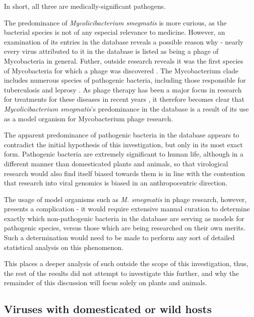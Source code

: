\documentclass[12pt]{article}
\begin{document}
    In short, all three are medically-significant pathogens.

    The predominance of \emph{Mycolicibacterium smegmatis} is more curious, as the
    bacterial species is not of any especial relevance to medicine. However, an examination of 
    its entries in the database reveals a possible reason why - nearly every virus
    attributed to it in the database is listed as being a phage of Mycobacteria in
    general. Futher, outside research reveals it was the first species of
    Mycobacteria for which a phage was discovered \cite{first_myco}.
    The Mycobacterium clade includes numerous species of pathogenic
    bacteria, including those responsible for tuberculosis and leprosy \cite{myco}. As 
    phage therapy has been a major focus in research for treatments for these
    diseases in recent years \cite{myco_phage}, it therefore becomes clear that
    \emph{Mycolicibacterium smegmatis}'s predominance in the database is a result
    of its use as a model organism for Mycobacterium phage research.

    The apparent predominance of pathogenic bacteria in the database appears
    to contradict the initial hypothesis of this investigation, but only in its
    most exact form. Pathogenic bacteria are extremely significant to human life,
    although in a different manner than domesticated plants and animals,
    so that virological research would also find itself biased towards them is in
    line with the contention that research into viral genomics is biased in an
    anthropocentric direction.

    The usage of model organisms such as \emph{M. smegmatis} in phage
    research, however, presents a complication - it would require extensive manual
    curation to determine exactly which non-pathogenic bacteria in the database
    are serving as models for pathogenic species, versus those which are being researched
    on their own merits. Such a determination would need to be made to perform any
    sort of detailed statistical analysis on this phenomenon.

    This places a deeper analysis of such outside the scope of this investigation,
    thus, the rest of the results did not attempt to investigate
    this further, and why the remainder of this discussion will focus solely on
    plants and animals.

    \subsection{Viruses with domesticated or wild hosts}
\end{document}
